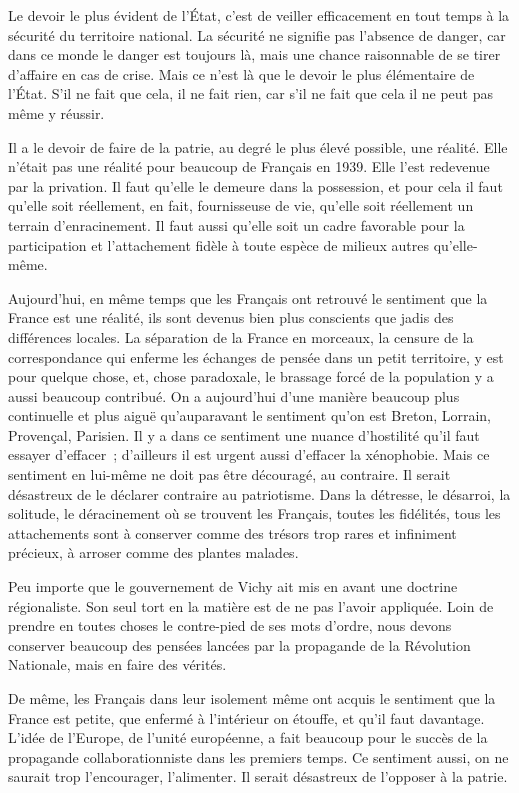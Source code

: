 \documentclass[french,twoside]{book} %
\begin{document}
Le devoir le plus évident de l'État, c'est de veiller efficacement en tout temps à la sécurité du territoire national. La sécurité ne signifie pas l'absence de danger, car dans ce monde le danger est toujours là, mais une chance raisonnable de se tirer d'affaire en cas de crise. Mais ce n'est là que le devoir le plus élémentaire de l'État. S'il ne fait que cela, il ne fait rien, car s'il ne fait que cela il ne peut pas même y réussir.\par
Il a le devoir de faire de la patrie, au degré le plus élevé possible, une réalité. Elle n'était pas une réalité pour beaucoup de Français en 1939. Elle l'est redevenue par la privation. Il faut qu'elle le demeure dans la possession, et pour cela il faut qu'elle soit réellement, en fait, fournisseuse de vie, qu'elle soit réellement un terrain d'enracinement. Il faut aussi qu'elle soit un cadre favorable pour la participation et l'attachement fidèle à toute espèce de milieux autres qu'elle-même.\par
Aujourd'hui, en même temps que les Français ont retrouvé le sentiment que la France est une réalité, ils sont devenus bien plus conscients que jadis des différences locales. La séparation de la France en morceaux, la censure de la correspondance qui enferme les échanges de pensée dans un petit territoire, y est pour quelque chose, et, chose paradoxale, le brassage forcé de la population y a aussi beaucoup contribué. On a aujourd'hui d'une manière beaucoup plus continuelle et plus aiguë qu'auparavant le sentiment qu'on est Breton, Lorrain, Provençal, Parisien. Il y a dans ce sentiment une nuance d'hostilité qu'il faut essayer d'effacer ; d'ailleurs il est urgent aussi d'effacer la xénophobie. Mais ce sentiment en lui-même ne doit pas être découragé, au contraire. Il serait désastreux de le déclarer contraire au patriotisme. Dans la détresse, le désarroi, la solitude, le déracinement où se trouvent les Français, toutes les fidélités, tous les attachements sont à conserver comme des trésors trop rares et infiniment précieux, à arroser comme des plantes malades.\par
Peu importe que le gouvernement de Vichy ait mis en avant une doctrine régionaliste. Son seul tort en la matière est de ne pas l'avoir appliquée. Loin de prendre en toutes choses le contre-pied de ses mots d'ordre, nous devons conserver beaucoup des pensées lancées par la propagande de la Révolution Nationale, mais en faire des vérités.\par
De même, les Français dans leur isolement même ont acquis le sentiment que la France est petite, que enfermé à l'intérieur on étouffe, et qu'il faut davantage. L'idée de l'Europe, de l'unité européenne, a fait beaucoup pour le succès de la propagande collaborationniste dans les premiers temps. Ce sentiment aussi, on ne saurait trop l'encourager, l'alimenter. Il serait désastreux de l'opposer à la patrie.\par
\end{document}
